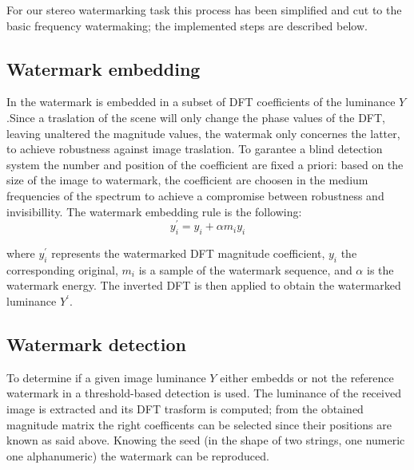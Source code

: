 For our stereo watermarking task this process has been simplified and cut to the basic frequency watermaking; the implemented steps are described below.

\subsection{Watermark embedding} 
\label{wat_emb}

In \cite{PIVA} the watermark is embedded in a subset of DFT coefficients of the luminance $Y$.\newline Since a traslation of the scene will only change the phase values of the DFT, leaving unaltered the magnitude values, the watermak only concernes the latter, to achieve robustness against image traslation.\newline
To garantee a blind detection system the number and position of the coefficient are fixed a priori: based on the size of the image to watermark, the coefficient are choosen in the medium frequencies of the spectrum to achieve a compromise between robustness and invisibillity.\newline 
The watermark embedding rule is the following:
\begin{equation}\label{eq:wat}
y_{i}^{'} = y_{i}+\alpha m_{i}y_{i} 
\end{equation}

where $y_{i}^{'}$ represents the watermarked DFT magnitude coefficient, $y_{i}$ the corresponding original, $m_{i}$ is a sample of the watermark sequence, and $\alpha$ is the watermark energy.\newline
The inverted DFT is then applied to obtain the watermarked luminance $Y^{'}$.

\subsection{Watermark detection}

To determine if a given image luminance $Y$ either embedds or not the reference watermark in \cite{PIVA} a threshold-based detection is used.\newline
The luminance of the received image is extracted and its DFT trasform is computed; from the obtained magnitude matrix the right coefficents can be selected since their positions are known as said above.\newline
Knowing the seed (in the shape of two strings, one numeric one alphanumeric) the watermark can be reproduced.\newline

